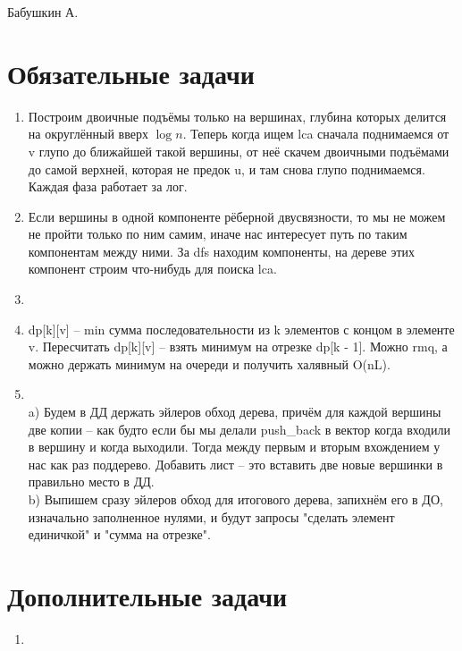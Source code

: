 \documentclass[12pt]{article}
\begin{document}
\def\t{\texttt}

Бабушкин А.

\section{Обязательные задачи}

\begin{enumerate}
	\setlength{\parskip}{0pt} 
	\setlength{\itemsep}{0pt} 
	\item Построим двоичные подъёмы только на вершинах, глубина которых делится на округлённый вверх $\log n$. Теперь когда ищем lca сначала поднимаемся от v 
    глупо до ближайшей такой вершины, от неё скачем двоичными подъёмами до самой верхней, которая не предок u, и там снова глупо поднимаемся. Каждая фаза работает 
    за лог. \\
    \item Если вершины в одной компоненте рёберной двусвязности, то мы не можем не пройти только по ним самим, иначе нас интересует путь по таким компонентам между ними. 
    За dfs находим компоненты, на дереве этих компонент строим что-нибудь для поиска lca. \\
    \item ~\\
    \item dp[k][v] -- min сумма последовательности из k элементов с концом в элементе v. Пересчитать dp[k][v] -- взять минимум на отрезке dp[k - 1]. Можно rmq, а 
    можно держать минимум на очереди и получить халявный O(nL). \\
    \item ~\\
    a) Будем в ДД держать эйлеров обход дерева, причём для каждой вершины две копии -- как будто если бы мы делали push\_back в вектор когда входили в вершину и 
    когда выходили. Тогда между первым и вторым вхождением у нас как раз поддерево. Добавить лист -- это вставить две новые вершинки в правильно место в ДД. \\
    b) Выпишем сразу эйлеров обход для итогового дерева, запихнём его в ДО, изначально заполненное нулями, и будут запросы "сделать элемент единичкой" и "сумма на отрезке". \\
\end{enumerate}

\section{Дополнительные задачи}
\begin{enumerate}
	\setlength{\parskip}{0pt} 
	\setlength{\itemsep}{0pt} 
	\item
\end{enumerate}
\end{document}
